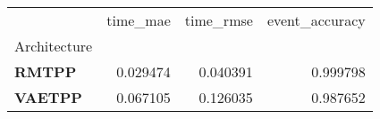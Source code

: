 \begin{tabular}{lrrr}
\toprule
 & time_mae & time_rmse & event_accuracy \\
Architecture &  &  &  \\
\midrule
\textbf{RMTPP} & 0.029474 & 0.040391 & 0.999798 \\
\textbf{VAETPP} & 0.067105 & 0.126035 & 0.987652 \\
\bottomrule
\end{tabular}
